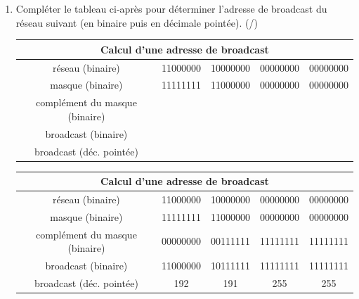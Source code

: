 \begin{enumerate}[resume=monDS]
    \item Compléter le tableau ci-après pour déterminer l'adresse de broadcast du réseau suivant (en binaire puis en décimale pointée). (/)

    \begin{blocvisiblex}[height=5]
    {\centering
    \renewcommand{\arraystretch}{1.5} %
    \begin{tabular}{|c|c|c|c|c|}
        \hline
        \multicolumn{5}{|c|}{\textbf{Calcul d’une adresse de broadcast}} \\ \hline
        réseau (binaire) & 11000000 & 10000000 & 00000000 & 00000000 \\ \hline
        masque (binaire) & 11111111 & 11000000 & 00000000 & 00000000 \\ \hline
        complément du masque (binaire) & & & & \\ \hline
        broadcast (binaire) & & & & \\ \hline
        broadcast (déc. pointée) & & & & \\ \hline
    \end{tabular}}
    \centering
    \renewcommand{\arraystretch}{1.5} %
    \begin{tabular}{|c|c|c|c|c|}
        \hline
        \multicolumn{5}{|c|}{\textbf{Calcul d’une adresse de broadcast}} \\ \hline
        réseau (binaire) & 11000000 & 10000000 & 00000000 & 00000000 \\ \hline
        masque (binaire) & 11111111 & 11000000 & 00000000 & 00000000 \\ \hline
        complément du masque (binaire) & 00000000 & 00111111 & 11111111 & 11111111 \\ \hline
        broadcast (binaire) & 11000000 & 10111111 & 11111111 & 11111111 \\ \hline
        broadcast (déc. pointée) & 192 & 191 & 255 & 255 \\ \hline
        
    \end{tabular}
        
    \end{blocvisiblex}
    


\end{enumerate}

\medskip

